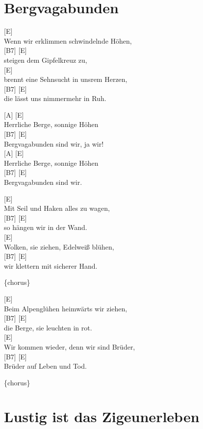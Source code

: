 \documentclass[
  letterpaper,
]{scrbook}
\begin{document}
\hypertarget{bergvagabunden}{%
\chapter{Bergvagabunden}\label{bergvagabunden}}

{[}E{]}\\
Wenn wir erklimmen schwindelnde Höhen,\\
{[}B7{]} {[}E{]}\\
steigen dem Gipfelkreuz zu,\\
{[}E{]}\\
brennt eine Sehnsucht in uns\textquotesingle rem Herzen,\\
{[}B7{]} {[}E{]}\\
die lässt uns nimmermehr in Ruh.

{[}A{]} {[}E{]}\\
Herrliche Berge, sonnige Höhen\\
{[}B7{]} {[}E{]}\\
Bergvagabunden sind wir, ja wir!\\
{[}A{]} {[}E{]}\\
Herrliche Berge, sonnige Höhen\\
{[}B7{]} {[}E{]}\\
Bergvagabunden sind wir.

{[}E{]}\\
Mit Seil und Haken alles zu wagen,\\
{[}B7{]} {[}E{]}\\
so hängen wir in der Wand.\\
{[}E{]}\\
Wolken, sie ziehen, Edelweiß blühen,\\
{[}B7{]} {[}E{]}\\
wir klettern mit sicherer Hand.

\{chorus\}

{[}E{]}\\
Beim Alpenglühen heimwärts wir ziehen,\\
{[}B7{]} {[}E{]}\\
die Berge, sie leuchten in rot.\\
{[}E{]}\\
Wir kommen wieder, denn wir sind Brüder,\\
{[}B7{]} {[}E{]}\\
Brüder auf Leben und Tod.

\{chorus\}

\hypertarget{lustig-ist-das-zigeunerleben}{%
\chapter{Lustig ist das
Zigeunerleben}\label{lustig-ist-das-zigeunerleben}}
\end{document}
